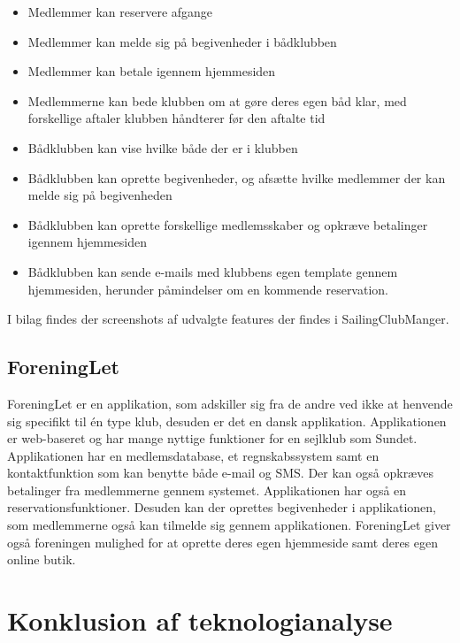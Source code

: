\begin{itemize}
  \item Medlemmer kan reservere afgange
  \item Medlemmer kan melde sig på begivenheder i bådklubben
  \item Medlemmer kan betale igennem hjemmesiden
  \item Medlemmerne kan bede klubben om at gøre deres egen båd klar, med forskellige aftaler klubben håndterer
        før den aftalte tid
  \item Bådklubben kan vise hvilke både der er i klubben
  \item Bådklubben kan oprette begivenheder, og afsætte hvilke medlemmer der kan melde sig på begivenheden
  \item Bådklubben kan oprette forskellige medlemsskaber og opkræve betalinger igennem hjemmesiden
  \item Bådklubben kan sende e-mails med klubbens egen template gennem hjemmesiden, herunder påmindelser om en
        kommende reservation.
\end{itemize}

I bilag  findes der screenshots af udvalgte features der findes i SailingClubManger.

\subsection*{ForeningLet}

ForeningLet er en applikation, som adskiller sig fra de andre ved ikke at henvende sig specifikt til én type klub, desuden er det en dansk applikation. 
Applikationen er web-baseret og har mange nyttige funktioner for en sejlklub som Sundet. 
Applikationen har en medlemsdatabase, et regnskabssystem samt en kontaktfunktion som kan benytte både e-mail og SMS. 
Der kan også opkræves betalinger fra medlemmerne gennem systemet. 
Applikationen har også en reservationsfunktioner. 
Desuden kan der oprettes begivenheder i applikationen, som medlemmerne også kan tilmelde sig gennem applikationen. ForeningLet giver også foreningen mulighed for at oprette deres egen hjemmeside samt deres egen online butik. 

\section{Konklusion af teknologianalyse}

